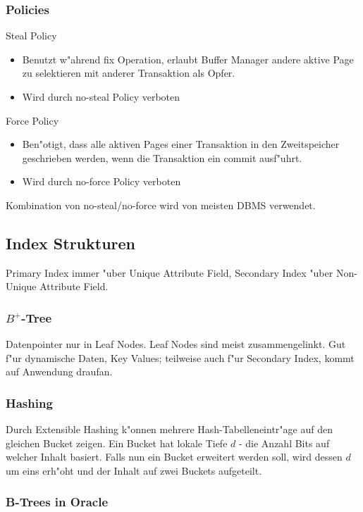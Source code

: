 \documentclass[german, 10pt, a4paper, twocolumn]{scrartcl}
\theoremstyle{definition}
\theoremstyle{remark}
\theoremstyle{example}
\begin{document}
\subsubsection{Policies}

Steal Policy
\begin{itemize}
	\item Benutzt w"ahrend fix Operation, erlaubt Buffer Manager andere aktive Page zu selektieren mit anderer Transaktion als Opfer.
	\item Wird durch no-steal Policy verboten
\end{itemize}

Force Policy
\begin{itemize}
	\item Ben"otigt, dass alle aktiven Pages einer Transaktion in den Zweitspeicher geschrieben werden, wenn die Transaktion ein commit ausf"uhrt.
	\item Wird durch no-force Policy verboten
\end{itemize}

Kombination von no-steal/no-force wird von meisten DBMS verwendet.

\subsection{Index Strukturen}

Primary Index immer "uber Unique Attribute Field, Secondary Index "uber Non-Unique Attribute Field.

\subsubsection{$B^+$-Tree}

Datenpointer nur in Leaf Nodes. Leaf Nodes sind meist zusammengelinkt. Gut f"ur dynamische Daten, Key Values; teilweise auch f"ur Secondary Index, kommt auf Anwendung draufan.

\subsubsection{Hashing}

Durch Extensible Hashing k"onnen mehrere Hash-Tabelleneintr"age auf den gleichen Bucket zeigen. Ein Bucket hat lokale Tiefe $d$ - die Anzahl Bits auf welcher Inhalt basiert. Falls nun ein Bucket erweitert werden soll, wird dessen $d$ um eins erh"oht und der Inhalt auf zwei Buckets aufgeteilt.

\subsubsection{B-Trees in Oracle}
\end{document}
